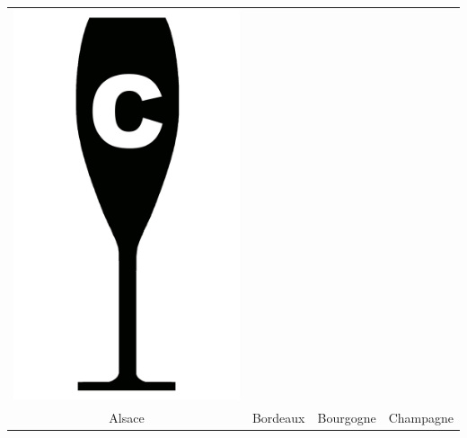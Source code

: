 {\begin{center}
\begin{tabular}{ c c c c}
\includegraphics[scale=0.021, trim= 0em -5em -5em -5em,]{Icones/icon_champagne_black.pdf}
\\
	Alsace  & Bordeaux & Bourgogne & Champagne \\
\end{tabular}
\end{center}
}	
